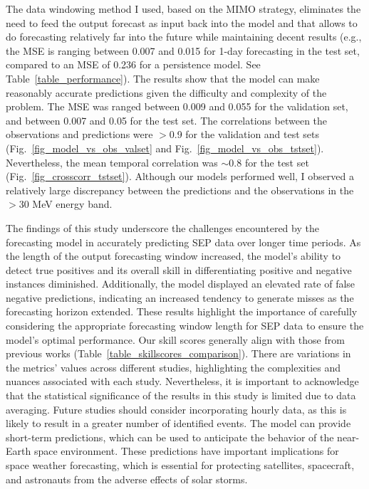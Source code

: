 The data windowing method I used, based on the MIMO strategy, eliminates the need to feed the output forecast as input back into the model and that allows to do forecasting relatively far into the future while maintaining decent results (e.g., the MSE is ranging between 0.007 and 0.015 for 1-day forecasting in the test set, compared to an MSE of 0.236 for a persistence model. See Table~\ref{table_performance}).
The results show that the model can make reasonably accurate predictions given the difficulty and complexity of the problem.
The MSE was ranged between 0.009 and 0.055 for the validation set, and between 0.007 and 0.05 for the test set.
The correlations between the observations and predictions were $>$0.9 for the validation and test sets (Fig.~\ref{fig_model_vs_obs_valset} and Fig.~\ref{fig_model_vs_obs_tstset}).
Nevertheless, the mean temporal correlation was $\sim$0.8 for the test set (Fig.~\ref{fig_crosscorr_tstset}).
Although our models performed well, I observed a relatively large discrepancy between the predictions and the observations in the $>$30 MeV energy band.

The findings of this study underscore the challenges encountered by the forecasting model in accurately predicting SEP data over longer time periods. As the length of the output forecasting window increased, the model's ability to detect true positives and its overall skill in differentiating positive and negative instances diminished. Additionally, the model displayed an elevated rate of false negative predictions, indicating an increased tendency to generate misses as the forecasting horizon extended. These results highlight the importance of carefully considering the appropriate forecasting window length for SEP data to ensure the model's optimal performance. Our skill scores generally align with those from previous works (Table~\ref{table_skillscores_comparison}). There are variations in the metrics' values across different studies, highlighting the complexities and nuances associated with each study. Nevertheless, it is important to acknowledge that the statistical significance of the results in this study is limited due to data averaging. Future studies should consider incorporating hourly data, as this is likely to result in a greater number of identified events.
The model can provide short-term predictions, which can be used to anticipate the behavior of the near-Earth space environment. These predictions have important implications for space weather forecasting, which is essential for protecting satellites, spacecraft, and astronauts from the adverse effects of solar storms.

